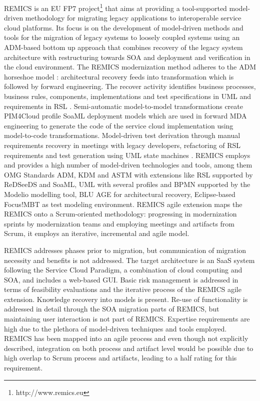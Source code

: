 REMICS \autocite{Krasteva2013REMICSAgile,Wendland2013REMICS,REMICS2013RecoverPrinciples,REMICS2013Migrate,Remics2013RecoverToolkit,Mohagheghi2011REMICS,Sadovykh2011REMICS,Mohagheghi2010REMICS} is an EU FP7 project\footnote{http://www.remics.eu} that aims at providing a tool-supported model-driven methodology for migrating legacy applications to interoperable service cloud platforms.
Its focus is on the development of model-driven methods and tools for the migration of legacy systems to loosely coupled systems using an ADM-based bottom up approach that combines recovery of the legacy system architecture with restructuring towards SOA and deployment and verification in the cloud environment.
The REMICS modernization method adheres to the ADM horseshoe model \autocite{Perez-Castillo2011KDM,Perez-Castillo2011MARBLE,Khusidman2007}: architectural recovery feeds into transformation which is followed by forward engineering.
The recover activity identifies business processes, business rules, components, implementations and test specifications in UML and requirements in RSL \autocite{REMICS2013Migrate}.
Semi-automatic model-to-model transformations create PIM4Cloud profile SoaML deployment models which are used in forward MDA \autocite{OMG2014MDA} engineering to generate the code of the service cloud implementation using model-to-code transformations.
Model-driven test derivation through manual requirements recovery in meetings with legacy developers, refactoring of RSL requirements and test generation using UML state machines \autocite{Wendland2013REMICS}.
REMICS employs and provides a high number of model-driven technologies and tools, among them OMG Standards ADM, KDM and ASTM with extensions like RSL supported by ReDSeeDS and SoaML, UML with several profiles and BPMN supported by the Modelio modelling tool, BLU AGE for architectural recovery, Eclipse-based Focus!MBT as test modeling environment.
REMICS agile extension \autocite{Krasteva2013REMICSAgile} maps the REMICS onto a Scrum-oriented methodology: progressing in modernization sprints by modernization teams and employing meetings and artifacts from Scrum, it employs an iterative, incremental and agile model.

REMICS addresses phases prior to migration, but communication of migration necessity and benefits is not addressed.
The target architecture is an SaaS system following the Service Cloud Paradigm, a combination of cloud computing and SOA, and includes a web-based GUI.
Basic risk management is addressed in terms of feasibility evaluations and the iterative process of the REMICS agile extension.
Knowledge recovery into models is present.
Re-use of functionality is addressed in detail through the SOA migration parts of REMICS, but maintaining user interaction is not part of REMICS.
Expertise requirements are high due to the plethora of model-driven techniques and tools employed.
REMICS has been mapped into an agile process and even though not explicitly described, integration on both process and artifact level would be possible due to high overlap to Scrum process and artifacts, leading to a half rating for this requirement.

